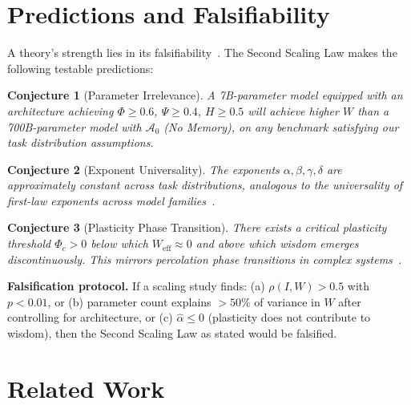 \documentclass{article}
\newtheorem{conjecture}{Conjecture}
\newcommand{\cA}{\mathcal{A}}
\begin{document}
\section{Predictions and Falsifiability}
\label{sec:predictions}

A theory's strength lies in its falsifiability~\citep{popper1959logic}.
The Second Scaling Law makes the following testable predictions:

\begin{conjecture}[Parameter Irrelevance]
\label{conj:param}
A 7B-parameter model equipped with an architecture achieving $\Phi \geq 0.6$, $\Psi \geq 0.4$, $H \geq 0.5$ will achieve higher $W$ than a 700B-parameter model with $\cA_0$ (No Memory), on any benchmark satisfying our task distribution assumptions.
\end{conjecture}

\begin{conjecture}[Exponent Universality]
\label{conj:universal}
The exponents $\alpha, \beta, \gamma, \delta$ are approximately constant across task distributions, analogous to the universality of first-law exponents across model families~\citep{kaplan2020scaling}.
\end{conjecture}

\begin{conjecture}[Plasticity Phase Transition]
\label{conj:phase}
There exists a critical plasticity threshold $\Phi_c > 0$ below which $W_{\text{eff}} \approx 0$ and above which wisdom emerges discontinuously.
This mirrors percolation phase transitions in complex systems~\citep{stauffer2018introduction}.
\end{conjecture}

\textbf{Falsification protocol.}
If a scaling study finds:
(a) $\rho(I, W) > 0.5$ with $p < 0.01$, or
(b) parameter count explains $>50\%$ of variance in $W$ after controlling for architecture, or
(c) $\hat{\alpha} \leq 0$ (plasticity does not contribute to wisdom),
then the Second Scaling Law as stated would be falsified.

\section{Related Work}
\label{sec:related}
\end{document}
